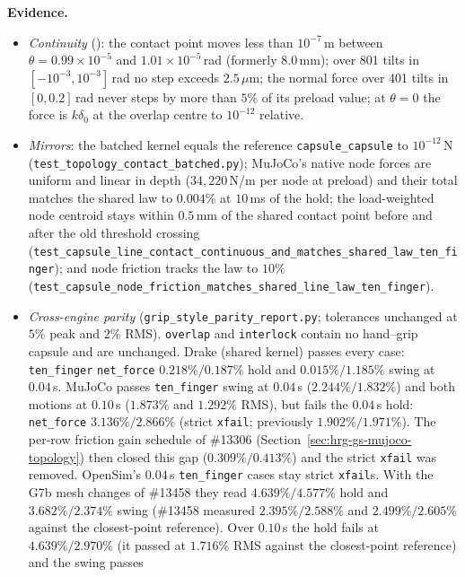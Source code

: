 \documentclass[11pt,a4paper]{article}
\begin{document}
\textbf{Evidence.}
\begin{itemize}[leftmargin=*,noitemsep]
\item \emph{Continuity} (): the contact point moves less than
  $10^{-7}$\,m between $\theta = 0.99 \times 10^{-5}$ and $1.01 \times 10^{-5}$\,rad (formerly $8.0$\,mm); over 801
  tilts in $[-10^{-3}, 10^{-3}]$\,rad no step exceeds $2.5\,\mu$m; the normal force over 401 tilts in $[0, 0.2]$\,rad
  never steps by more than $5\%$ of its preload value; at $\theta = 0$ the force is $k\delta_0$ at the overlap centre
  to $10^{-12}$ relative.
\item \emph{Mirrors}: the batched kernel equals the reference \texttt{capsule\_capsule} to $10^{-12}$\,N
  (\texttt{test\_topology\_contact\_batched.py}); MuJoCo's native node forces are uniform and linear in depth
  ($34{,}220$\,N/m per node at preload) and their total matches the shared law to $0.004\%$ at $10$\,ms of the hold;
  the load-weighted node centroid stays within $0.5$\,mm of the shared contact point before and after the old
  threshold crossing (\texttt{test\_capsule\_line\_contact\_continuous\_and\_matches\_shared\_law\_ten\_finger}); and
  node friction tracks the law to $10\%$ (\texttt{test\_capsule\_node\_friction\_matches\_shared\_line\_law\_ten\_finger}).
\item \emph{Cross-engine parity} (\texttt{grip\_style\_parity\_report.py}; tolerances unchanged at $5\%$ peak and $2\%$
  RMS). \texttt{overlap} and \texttt{interlock} contain no hand--grip capsule and are unchanged. Drake (shared kernel)
  passes every case: \texttt{ten\_finger} \texttt{net\_force} $0.218\% / 0.187\%$ hold and $0.015\% / 1.185\%$ swing at
  $0.04$\,s. MuJoCo passes \texttt{ten\_finger} swing at $0.04$\,s ($2.244\% / 1.832\%$) and both motions at $0.10$\,s
  ($1.873\%$ and $1.292\%$ RMS), but fails the $0.04$\,s hold: \texttt{net\_force} $3.136\% / 2.866\%$ (strict
  \texttt{xfail}; previously $1.902\% / 1.971\%$). The per-row friction gain schedule of \#13306 (Section~\ref{sec:hrg-gs-mujoco-topology}) then closed
  this gap ($0.309\% / 0.413\%$) and the strict \texttt{xfail} was removed. OpenSim's $0.04$\,s \texttt{ten\_finger} cases stay strict
  \texttt{xfail}s. With the G7b mesh changes of \#13458 they read $4.639\% / 4.577\%$ hold and $3.682\% / 2.374\%$ swing
  (\#13458 measured $2.395\% / 2.588\%$ and $2.499\% / 2.605\%$ against the closest-point reference). Over $0.10$\,s the
  hold fails at $4.639\% / 2.970\%$ (it passed at $1.716\%$ RMS against the closest-point reference) and the swing passes

\end{itemize}
\end{document}
